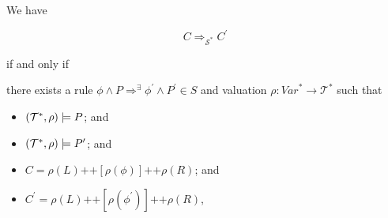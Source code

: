 \begin{lemma}\label{lem:simplifyComposite}
We have
\begin{proofenv}
    \begin{equation*}
        C \Rightarrow_{\mathcal{S}^*} C^\prime
    \end{equation*}
\end{proofenv}
    if and only if
\begin{proofenv}
    there exists a rule $\phi \land P \Rightarrow^\exists \phi^\prime \land P^\prime \in S$
    and valuation $\rho : \mathit{Var}^* \to \mathcal{T}^*$ such that
    \begin{itemize}
        \item $(\mathcal{T}^*, \rho) \models P$; and
        \item $(\mathcal{T}^*, \rho) \models P^\prime$; and
        \item $C = \rho(L) \texttt{++} [\rho(\phi)] \texttt{++} \rho(R)$; and
        \item $C^\prime = \rho(L) \texttt{++} [\rho(\phi^\prime)] 
        \texttt{++} \rho(R)$,
    \end{itemize}
\end{proofenv}
\end{lemma}
